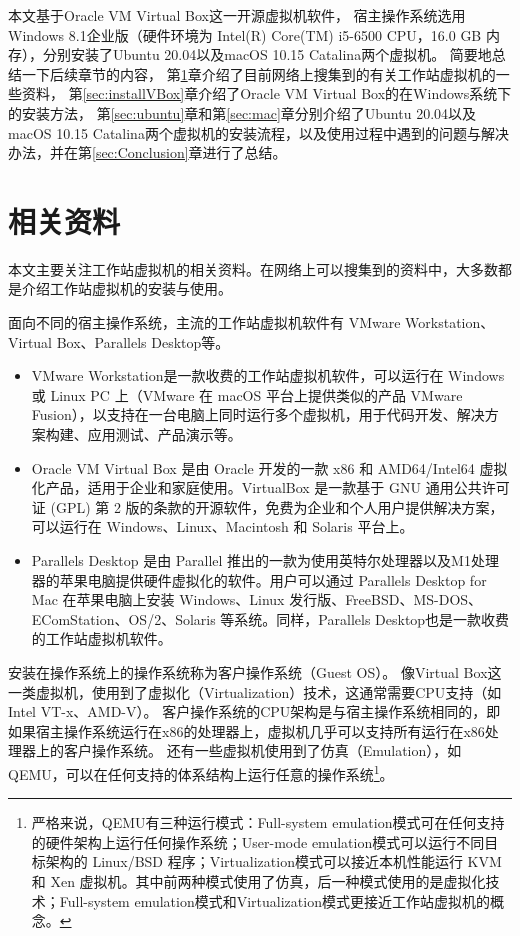 \documentclass[final]{cvpr}
\begin{document}
本文基于Oracle VM Virtual Box\cite{Web/VirtualBox}这一开源虚拟机软件，
宿主操作系统选用Windows 8.1企业版（硬件环境为 Intel(R) Core(TM) i5-6500 CPU，16.0 GB 内存），分别安装了Ubuntu 20.04以及macOS 10.15 Catalina两个虚拟机。
简要地总结一下后续章节的内容，
第\ref{sec:RelatedWorks}章介绍了目前网络上搜集到的有关工作站虚拟机的一些资料，
第\ref{sec:installVBox}章介绍了Oracle VM Virtual Box\cite{Web/VirtualBox}的在Windows系统下的安装方法，
第\ref{sec:ubuntu}章和第\ref{sec:mac}章分别介绍了Ubuntu 20.04以及macOS 10.15 Catalina两个虚拟机的安装流程，以及使用过程中遇到的问题与解决办法，并在第\ref{sec:Conclusion}章进行了总结。

\section{相关资料}
\label{sec:RelatedWorks}

本文主要关注工作站虚拟机的相关资料。在网络上可以搜集到的资料中，大多数都是介绍工作站虚拟机的安装与使用。

面向不同的宿主操作系统，主流的工作站虚拟机软件有
VMware Workstation、Virtual Box、Parallels Desktop等。

\begin{itemize}
\item VMware Workstation是一款收费的工作站虚拟机软件，可以运行在 Windows 或 Linux PC 上（VMware 在 macOS 平台上提供类似的产品 VMware  Fusion），以支持在一台电脑上同时运行多个虚拟机，用于代码开发、解决方案构建、应用测试、产品演示等\cite{Web/VMwareWorkstation}。
\item Oracle VM Virtual Box 是由 Oracle 开发的一款 x86 和 AMD64/Intel64 虚拟化产品，适用于企业和家庭使用。VirtualBox 是一款基于 GNU 通用公共许可证 (GPL) 第 2 版的条款的开源软件，免费为企业和个人用户提供解决方案\cite{Web/VirtualBox}，可以运行在 Windows、Linux、Macintosh 和 Solaris 平台上。
\item Parallels Desktop\cite{Web/ParallelsDesktop} 是由 Parallel 推出的一款为使用英特尔处理器以及M1处理器的苹果电脑提供硬件虚拟化的软件。用户可以通过 Parallels Desktop for Mac 在苹果电脑上安装 Windows、Linux 发行版、FreeBSD、MS-DOS、EComStation、OS/2、Solaris 等系统。同样，Parallels Desktop也是一款收费的工作站虚拟机软件。
\end{itemize}

安装在操作系统上的操作系统称为客户操作系统（Guest OS）。
像Virtual Box这一类虚拟机，使用到了虚拟化（Virtualization）技术，这通常需要CPU支持（如Intel VT-x、AMD-V）。
客户操作系统的CPU架构是与宿主操作系统相同的，即如果宿主操作系统运行在x86的处理器上，虚拟机几乎可以支持所有运行在x86处理器上的客户操作系统。
还有一些虚拟机使用到了仿真（Emulation），如QEMU\cite{Web/QEMU}，可以在任何支持的体系结构上运行任意的操作系统\footnote{严格来说，QEMU有三种运行模式：Full-system emulation模式可在任何支持的硬件架构上运行任何操作系统；User-mode emulation模式可以运行不同目标架构的 Linux/BSD 程序；Virtualization模式可以接近本机性能运行 KVM 和 Xen 虚拟机\cite{Web/QEMU}。其中前两种模式使用了仿真，后一种模式使用的是虚拟化技术；Full-system emulation模式和Virtualization模式更接近工作站虚拟机的概念。}。
\end{document}
